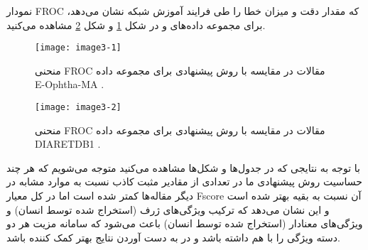 \noindent
نمودار FROC که مقدار دقت و میزان خطا را طی فرایند آموزش شبکه نشان می‌دهد، برای مجموعه داده‌های  و  در شکل \ref{image5-1} و شکل ‏\ref{image5-2} مشاهده می‌کنید.

\begin{figure}[h]
\centering
  \texttt{[image: image3-1]}
  \caption{منحنی FROC مقالات در مقایسه با روش پیشنهادی برای مجموعه داده E-Ophtha-MA \cite{ref1}.}
  \label{image5-1}
\end{figure}

\begin{figure}[h]
\centering
  \texttt{[image: image3-2]}
  \caption{منحنی FROC مقالات در مقایسه با روش پیشنهادی برای مجموعه داده DIARETDB1 \cite{ref1}.}
  \label{image5-2}
\end{figure}

\noindent
با توجه به نتایجی که در جدول‌ها و شکل‌ها مشاهده می‌کنید متوجه می‌شویم که هر چند حساسیت روش پیشنهادی ما در تعدادی از مقادیر مثبت کاذب نسبت به موارد مشابه در دیگر مقاله‌ها کمتر شده است اما در کل معیار Fscore آن نسبت به بقیه بهتر شده است و این نشان می‌دهد که ترکیب ویژگی‌های ژرف (استخراج شده توسط انسان) و ویژگی‌های معنادار (استخراج شده توسط انسان) باعث می‌شود که سامانه مزیت هر دو دسته ویژگی را با هم داشته باشد و در به دست آوردن نتایج بهتر کمک کننده باشد.

